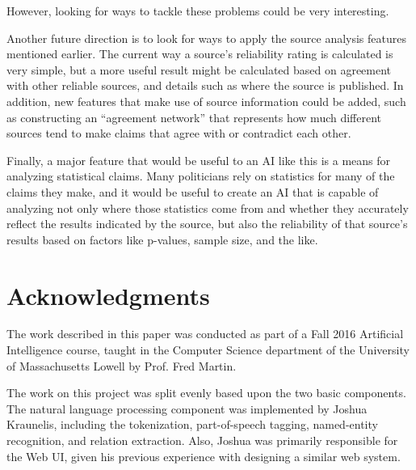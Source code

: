 \documentclass{chi2009}
\begin{document}
However, looking for ways to tackle these problems could be very interesting.

Another future direction is to look for ways to apply the source analysis features mentioned earlier.
The current way a source's reliability rating is calculated is very simple, but a more useful result might be calculated based on agreement with other reliable sources, and details such as where the source is published.
In addition, new features that make use of source information could be added, such as constructing an ``agreement network'' that represents how much different sources tend to make claims that agree with or contradict each other.

Finally, a major feature that would be useful to an AI like this is a means for analyzing statistical claims.
Many politicians rely on statistics for many of the claims they make, and it would be useful to create an AI that is capable of analyzing not only where those statistics come from and whether they accurately reflect the results indicated by the source, but also the reliability of that source's results based on factors like p-values, sample size, and the like.

\section{Acknowledgments}

The work described in this paper was conducted as part of a Fall 2016 Artificial Intelligence course, taught in the Computer Science department of the University of Massachusetts Lowell by Prof. Fred Martin.

The work on this project was split evenly based upon the two basic components.  The natural language processing component was implemented by Joshua Kraunelis, including the tokenization, part-of-speech tagging, named-entity recognition, and relation extraction.  Also, Joshua was primarily responsible for the Web UI, given his previous experience with designing a similar web system.




\end{document}

